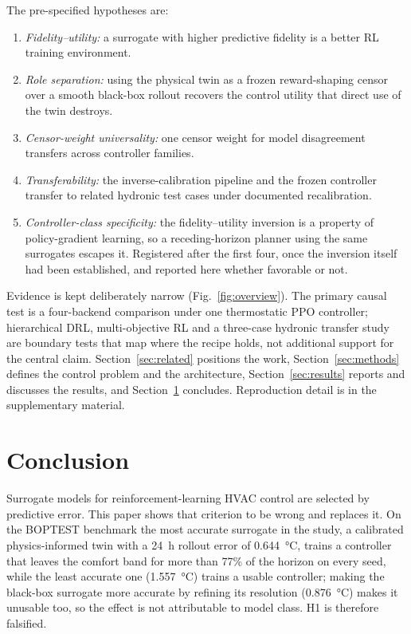 \documentclass{ieeeaccess}
\begin{document}
The pre-specified hypotheses are:

\begin{enumerate}[label=\textbf{H\arabic*.},leftmargin=2.8em,itemsep=2pt,topsep=3pt]
\item \emph{Fidelity--utility:} a surrogate with higher predictive fidelity is a
better RL training environment.
\item \emph{Role separation:} using the physical twin as a frozen reward-shaping
censor over a smooth black-box rollout recovers the control utility that direct
use of the twin destroys.
\item \emph{Censor-weight universality:} one censor weight for model
disagreement transfers across controller families.
\item \emph{Transferability:} the inverse-calibration pipeline and the frozen
controller transfer to related hydronic test cases under documented
recalibration.
\item \emph{Controller-class specificity:} the fidelity--utility inversion is a
property of policy-gradient learning, so a receding-horizon planner using the
same surrogates escapes it. Registered after the first four, once the inversion
itself had been established, and reported here whether favorable or not.
\end{enumerate}

Evidence is kept deliberately narrow (Fig.~\ref{fig:overview}). The primary
causal test is a four-backend comparison under one thermostatic PPO controller;
hierarchical DRL, multi-objective RL and a three-case hydronic transfer study
are boundary tests that map where the recipe holds, not additional support for
the central claim. Section~\ref{sec:related} positions the work,
Section~\ref{sec:methods} defines the control problem and the architecture,
Section~\ref{sec:results} reports and discusses the results, and
Section~\ref{sec:conclusions} concludes. Reproduction detail is in the
supplementary material.





\section{Conclusion}
\label{sec:conclusions}

Surrogate models for reinforcement-learning HVAC control are selected by
predictive error. This paper shows that criterion to be wrong and replaces it.
On the BOPTEST benchmark the most accurate surrogate in the study, a calibrated
physics-informed twin with a 24~h rollout error of \SI{0.644}{\celsius}, trains
a controller that leaves the comfort band for more than 77\% of the horizon on
every seed, while the least accurate one (\SI{1.557}{\celsius}) trains a usable
controller; making the black-box surrogate more accurate by refining its
resolution (\SI{0.876}{\celsius}) makes it unusable too, so the effect is not
attributable to model class. H1 is therefore falsified.
\end{document}
